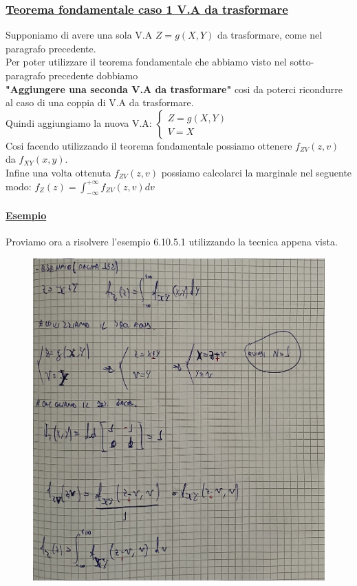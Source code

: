 \documentclass{article}
\begin{document}
\subsubsection{\underline{Teorema fondamentale caso 1 V.A da trasformare}}
Supponiamo di avere una sola V.A $Z = g(X,Y)$ da trasformare, come nel paragrafo precedente. \\
Per poter utilizzare il teorema fondamentale che abbiamo visto nel sotto-paragrafo precedente dobbiamo \\ \textbf{"Aggiungere una seconda V.A da trasformare"} cosi da poterci ricondurre al caso di una coppia di V.A da trasformare. \\
Quindi aggiungiamo la nuova V.A: $\begin{cases}
    Z = g(X,Y) \\
    V = X
\end{cases}$ \\
Cosi facendo utilizzando il teorema fondamentale possiamo ottenere $f_{ZV}(z,v)$ da $f_{XY}(x,y)$. \\
Infine una volta ottenuta $f_{ZV}(z,v)$ possiamo calcolarci la marginale nel seguente modo: $f_Z(z) = \int_{-\infty}^{+\infty} f_{ZV}(z,v) dv$
\paragraph{\underline{Esempio}}
Proviamo ora a risolvere l'esempio 6.10.5.1 utilizzando la tecnica appena vista.
\begin{figure}[H]
\centering
\includegraphics[scale=0.16]{ese/48.jpeg}
\end{figure} 
\end{document}
